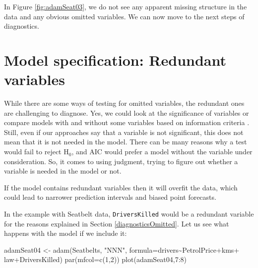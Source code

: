 \documentclass[
]{book}
\newenvironment{Shaded}{\begin{snugshade}}{\end{snugshade}}
\newcommand{\AttributeTok}[1]{\textcolor[rgb]{0.77,0.63,0.00}{#1}}
\newcommand{\DecValTok}[1]{\textcolor[rgb]{0.00,0.00,0.81}{#1}}
\newcommand{\FunctionTok}[1]{\textcolor[rgb]{0.00,0.00,0.00}{#1}}
\newcommand{\NormalTok}[1]{#1}
\newcommand{\OtherTok}[1]{\textcolor[rgb]{0.56,0.35,0.01}{#1}}
\newcommand{\SpecialCharTok}[1]{\textcolor[rgb]{0.00,0.00,0.00}{#1}}
\newcommand{\StringTok}[1]{\textcolor[rgb]{0.31,0.60,0.02}{#1}}
\theoremstyle{definition}
\theoremstyle{definition}
\theoremstyle{definition}
\theoremstyle{definition}
\theoremstyle{remark}
\begin{document}
In Figure \ref{fig:adamSeat03}, we do not see any apparent missing structure in the data and any obvious omitted variables. We can now move to the next steps of diagnostics.

\hypertarget{diagnosticsRedundant}{%
\section{Model specification: Redundant variables}\label{diagnosticsRedundant}}

While there are some ways of testing for omitted variables, the redundant ones are challenging to diagnose. Yes, we could look at the significance of variables \citep[Section 5.3 of][]{SvetunkovSBA} or compare models with and without some variables based on information criteria \citep[Section 13.4 of][]{SvetunkovSBA}. Still, even if our approaches say that a variable is not significant, this does not mean that it is not needed in the model. There can be many reasons why a test would fail to reject H\(_0\), and AIC would prefer a model without the variable under consideration. So, it comes to using judgment, trying to figure out whether a variable is needed in the model or not.

If the model contains redundant variables then it will overfit the data, which could lead to narrower prediction intervals and biased point forecasts.

In the example with Seatbelt data, \texttt{DriversKilled} would be a redundant variable for the reasons explained in Section \ref{diagnosticsOmitted}. Let us see what happens with the model if we include it:

\begin{Shaded}
\begin{Highlighting}[]
\NormalTok{adamSeat04 }\OtherTok{\textless{}{-}} \FunctionTok{adam}\NormalTok{(Seatbelts, }\StringTok{"NNN"}\NormalTok{, }
                   \AttributeTok{formula=}\NormalTok{drivers}\SpecialCharTok{\textasciitilde{}}\NormalTok{PetrolPrice}\SpecialCharTok{+}\NormalTok{kms}\SpecialCharTok{+}
\NormalTok{                     law}\SpecialCharTok{+}\NormalTok{DriversKilled)}
\FunctionTok{par}\NormalTok{(}\AttributeTok{mfcol=}\FunctionTok{c}\NormalTok{(}\DecValTok{1}\NormalTok{,}\DecValTok{2}\NormalTok{))}
\FunctionTok{plot}\NormalTok{(adamSeat04,}\DecValTok{7}\SpecialCharTok{:}\DecValTok{8}\NormalTok{)}
\end{Highlighting}
\end{Shaded}
\end{document}
